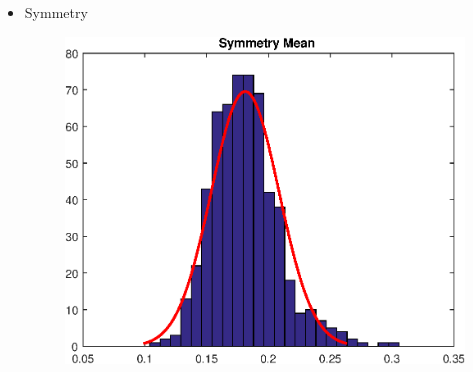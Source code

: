 \documentclass[11pt,a4paper]{article}
\numberwithin{equation}{section}
\begin{document}
\begin{itemize}
\item Symmetry
\begin{figure}[H]
\centering
  \includegraphics[width=.5\linewidth]{./img/symmetry_mean}
  \label{fig:test1}
\end{figure}%


\end{itemize}
\end{document}
